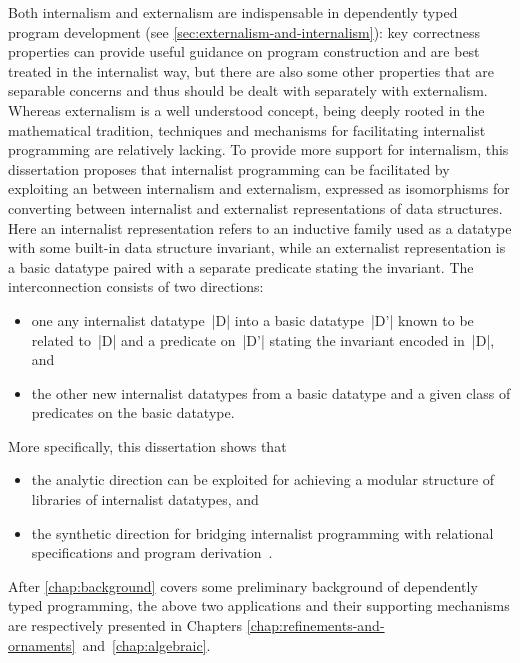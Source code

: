 Both internalism and externalism are indispensable in dependently typed program development (see \autoref{sec:externalism-and-internalism}): key correctness properties can provide useful guidance on program construction and are best treated in the internalist way, but there are also some other properties that are separable concerns and thus should be dealt with separately with externalism.
Whereas externalism is a well understood concept, being deeply rooted in the mathematical tradition, techniques and mechanisms for facilitating internalist programming are relatively lacking.
To provide more support for internalism, this dissertation proposes that internalist programming can be facilitated by exploiting an  between internalism and externalism, expressed as isomorphisms for converting between internalist and externalist representations of data structures.
Here an internalist representation refers to an inductive family used as a datatype with some built-in data structure invariant, while an externalist representation is a basic datatype paired with a separate predicate stating the invariant.
The interconnection consists of two directions:
\begin{itemize}
\item one  any internalist datatype~|D| into a basic datatype~|D'| known to be related to~|D| and a predicate on~|D'| stating the invariant encoded in~|D|, and
\item the other  new internalist datatypes from a basic datatype and a given class of predicates on the basic datatype.
\end{itemize}
More specifically, this dissertation shows that
\begin{itemize}
\item the analytic direction can be exploited for achieving a modular structure of libraries of internalist datatypes, and
\item the synthetic direction for bridging internalist programming with relational specifications and program derivation~\citep{Bird-AoP}.
\end{itemize}
After \autoref{chap:background} covers some preliminary background of dependently typed programming, the above two applications and their supporting mechanisms are respectively presented in Chapters \ref{chap:refinements-and-ornaments}~and~\ref{chap:algebraic}.
